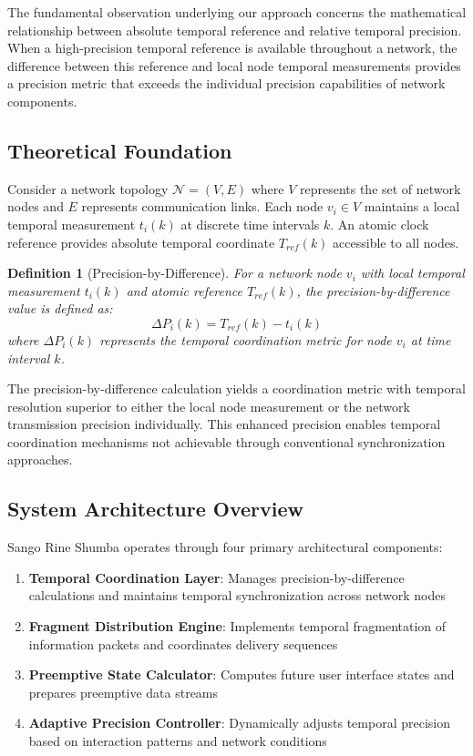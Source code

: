 \documentclass[12pt,a4paper]{article}
\newtheorem{definition}{Definition}
\begin{document}
The fundamental observation underlying our approach concerns the mathematical relationship between absolute temporal reference and relative temporal precision. When a high-precision temporal reference is available throughout a network, the difference between this reference and local node temporal measurements provides a precision metric that exceeds the individual precision capabilities of network components.

\subsection{Theoretical Foundation}

Consider a network topology $\mathcal{N} = (V, E)$ where $V$ represents the set of network nodes and $E$ represents communication links. Each node $v_i \in V$ maintains a local temporal measurement $t_i(k)$ at discrete time intervals $k$. An atomic clock reference provides absolute temporal coordinate $T_{ref}(k)$ accessible to all nodes.

\begin{definition}[Precision-by-Difference]
For a network node $v_i$ with local temporal measurement $t_i(k)$ and atomic reference $T_{ref}(k)$, the precision-by-difference value is defined as:
\begin{equation}
\Delta P_i(k) = T_{ref}(k) - t_i(k)
\label{eq:precision_difference}
\end{equation}
where $\Delta P_i(k)$ represents the temporal coordination metric for node $v_i$ at time interval $k$.
\end{definition}

The precision-by-difference calculation yields a coordination metric with temporal resolution superior to either the local node measurement or the network transmission precision individually. This enhanced precision enables temporal coordination mechanisms not achievable through conventional synchronization approaches.

\subsection{System Architecture Overview}

Sango Rine Shumba operates through four primary architectural components:

\begin{enumerate}
\item \textbf{Temporal Coordination Layer}: Manages precision-by-difference calculations and maintains temporal synchronization across network nodes
\item \textbf{Fragment Distribution Engine}: Implements temporal fragmentation of information packets and coordinates delivery sequences
\item \textbf{Preemptive State Calculator}: Computes future user interface states and prepares preemptive data streams
\item \textbf{Adaptive Precision Controller}: Dynamically adjusts temporal precision based on interaction patterns and network conditions
\end{enumerate}
\end{document}
